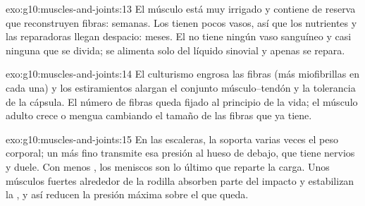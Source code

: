 \begin{solution}{exo:g10:muscles-and-joints:13}
El músculo está muy irrigado y contiene  de reserva que
reconstruyen fibras: semanas. Los  tienen pocos vasos, así
que los nutrientes y las  reparadoras llegan despacio: meses. El
 no tiene ningún vaso sanguíneo y casi ninguna  que se
divida; se alimenta solo del líquido sinovial y apenas se repara.
\end{solution}

\begin{solution}{exo:g10:muscles-and-joints:14}
El culturismo engrosa las fibras (más miofibrillas en cada una) y los
estiramientos alargan el conjunto músculo--tendón y la tolerancia de la
cápsula. El número de fibras queda fijado al principio de la vida; el
músculo adulto crece o mengua cambiando el tamaño de las fibras que ya
tiene.
\end{solution}

\begin{solution}{exo:g10:muscles-and-joints:15}
En las escaleras, la  soporta varias veces el peso
corporal; un  más fino transmite esa presión al hueso de
debajo, que tiene nervios y duele. Con menos , los meniscos
son lo último que reparte la carga. Unos músculos fuertes alrededor de
la rodilla absorben parte del impacto y estabilizan la , y
así reducen la presión máxima sobre el  que queda.
\end{solution}

